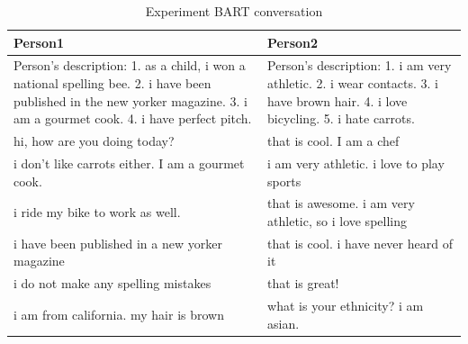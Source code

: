 \begin{table}[ht]
\centering
 \begin{tabular}{|p{7cm}|p{7cm}|} 
 \hline\hline
 \textbf{Person1} & \textbf{Person2} \\
 \hline\hline
 Person's description: 1. as a child, i won a national spelling bee. 2. i have been published in the new yorker magazine. 3. i am a gourmet cook. 4. i have perfect pitch. & Person's description: 1. i am very athletic. 2. i wear contacts. 3. i have brown hair. 4. i love bicycling. 5. i hate carrots. \\
 \hline
 hi, how are you doing today? & that is cool. I am a chef\\ 
 \hline
 i don't like carrots either. I am a gourmet cook.& i am very athletic. i love to play sports \\
 \hline
 i ride my bike to work as well. & that is awesome. i am very athletic, so i love spelling \\
 \hline 
 i have been published in a new yorker magazine & that is cool. i have never heard of it \\
 \hline
 i do not make any spelling mistakes & that is great! \\
 \hline 
 i am from california. my hair is brown & what is your ethnicity? i am asian. \\
 \hline\hline
 \end{tabular}
 \caption{Experiment BART conversation}
\label{tab:bart_conversation}
\end{table}


